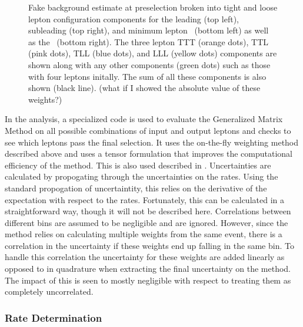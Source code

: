 \begin{figure}
\caption{Fake background estimate at preselection broken
into tight and loose lepton configuration components for the 
leading (top left), subleading (top right), and minimum lepton \pt~(bottom left)
as well as the \met~(bottom right). The three lepton TTT (orange dots),
TTL (pink dots), TLL (blue dots), and LLL (yellow dots) components
are shown along with any other components (green dots) such as those
with four leptons initally.  The sum of all these components is also
shown (black line). (what if I showed the absolute value of these weights?)}
\label{fig:mxm_components}
\end{figure}


In the analysis, a specialized code is used to evaluate the 
Generalized Matrix Method
on all possible combinations of input and output leptons and checks
to see which leptons pass the final selection. 
It uses the on-the-fly
weighting method described above and uses a tensor
formulation that improves the computational efficiency of the method.
This is also used described in \cite{Gillam:2014xua}.
Uncertainties are calculated by propogating through 
the uncertainties on the rates. 
Using the standard propogation of uncertaintity, this relies
on the derivative of the expectation with respect to the rates.
Fortunately, this can be calculated in a straightforward way,
though it will not be described here.
Correlations between different bins are assumed to be negligible and 
are ignored.  However, since the method relies on calculating multiple
weights from the same event, there is a correlation in the uncertainty
if these weights end up falling in the same bin. To handle this 
correlation the uncertainty for these weights are added linearly 
as opposed to in quadrature when extracting the final uncertainty 
on the method. The impact of this is seen to mostly negligible
with respect to treating them as completely uncorrelated.

\subsubsection{Rate Determination}

